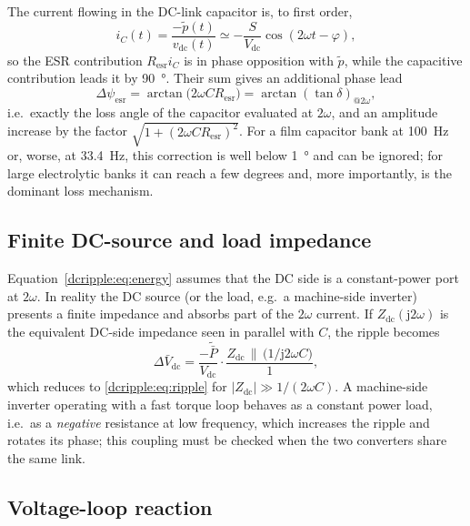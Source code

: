 The current flowing in the DC-link capacitor is, to first order,
\begin{equation}
  i_C(t) = \frac{-\tilde p(t)}{v_{\mathrm{dc}}(t)}
         \simeq -\frac{S}{V_{\mathrm{dc}}}\cos(2\omega t - \varphi),
\end{equation}
so the ESR contribution $R_{\mathrm{esr}} i_C$ is in phase opposition with
$\tilde p$, while the capacitive contribution leads it by \SI{90}{\degree}.
Their sum gives an additional phase lead
\begin{equation}
  \Delta\psi_{\mathrm{esr}} = \arctan\!\bigl(2\omega C R_{\mathrm{esr}}\bigr)
  = \arctan\!\left(\tan\delta\right)_{@2\omega},
\end{equation}
i.e.\ exactly the loss angle of the capacitor evaluated at $2\omega$, and an
amplitude increase by the factor $\sqrt{1+(2\omega C R_{\mathrm{esr}})^2}$. For
a film capacitor bank at \SI{100}{\hertz} or, worse, at \SI{33.4}{\hertz}, this
correction is well below \SI{1}{\degree} and can be ignored; for large
electrolytic banks it can reach a few degrees and, more importantly, is the
dominant loss mechanism.

\subsection{Finite DC-source and load impedance}

Equation~\eqref{dcripple:eq:energy} assumes that the DC side is a constant-power port at
$2\omega$. In reality the DC source (or the load, e.g.\ a machine-side inverter)
presents a finite impedance and absorbs part of the $2\omega$ current. If
$Z_{\mathrm{dc}}(\mathrm j 2\omega)$ is the equivalent DC-side impedance seen in
parallel with $C$, the ripple becomes
\begin{equation}
  \Delta \bar V_{\mathrm{dc}} =
  \frac{-\tilde{\bar P}}{V_{\mathrm{dc}}}\cdot
  \frac{Z_{\mathrm{dc}} \,\|\, \bigl(1/\mathrm j 2\omega C\bigr)}{1},
\end{equation}
which reduces to \eqref{dcripple:eq:ripple} for $|Z_{\mathrm{dc}}| \gg 1/(2\omega C)$.
A machine-side inverter operating with a fast torque loop behaves as a constant
power load, i.e.\ as a \emph{negative} resistance at low frequency, which
increases the ripple and rotates its phase; this coupling must be checked when
the two converters share the same link.

\subsection{Voltage-loop reaction}

